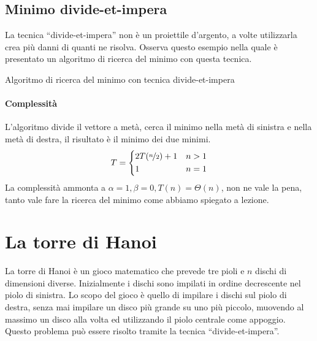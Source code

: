 \subsection*{Minimo divide-et-impera}

La tecnica \enquote{divide-et-impera} non è un proiettile d'argento, a volte utilizzarla crea più danni di quanti ne risolva.
Osserva questo esempio nella quale è presentato un algoritmo di ricerca del minimo con questa tecnica.

\begin{algorithm}[H]
\caption{Algoritmo di ricerca del minimo con tecnica divide-et-impera}
\end{algorithm}

\paragraph{Complessità}
L'algoritmo divide il vettore a metà, cerca il minimo nella metà di sinistra e nella metà di destra, il risultato è il minimo dei due minimi.
\begin{align*}
	T &=
	\begin{dcases}
		2T(\nicefrac{n}{2}) + 1 & n > 1\\
		1 & n = 1 \\
	\end{dcases}\\
\end{align*}
La complessità ammonta a \(\alpha=1, \beta=0, T(n) = \Theta(n)\), non ne vale la pena, tanto vale fare la ricerca del minimo come abbiamo spiegato a lezione.

\section{La torre di Hanoi}

La torre di Hanoi è un gioco matematico che prevede tre pioli e \(n\) dischi di dimensioni diverse.
Inizialmente i dischi sono impilati in ordine decrescente nel piolo di sinistra.
Lo scopo del gioco è quello di impilare i dischi sul piolo di destra, senza mai impilare un disco più grande su uno più piccolo, muovendo al massimo un disco alla volta ed utilizzando il piolo centrale come appoggio.
Questo problema può essere risolto tramite la tecnica \enquote{divide-et-impera}.

